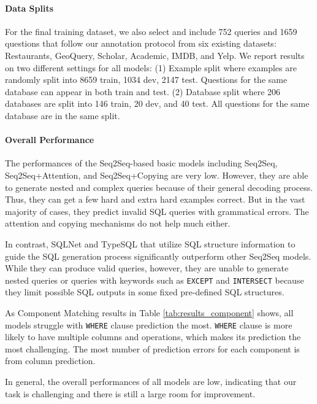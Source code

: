 \documentclass[11pt,a4paper]{article}
\begin{document}
\paragraph{Data Splits} 
For the final training dataset, we also select and include 752 queries and 1659 questions that follow our annotation protocol from six existing datasets: Restaurants, GeoQuery, Scholar, Academic, IMDB, and Yelp.
We report results on two different settings for all models: (1) Example split where examples are randomly split into 8659 train, 1034 dev, 2147 test. Questions for the same database can appear in both train and test. (2) Database split where 206 databases are split into 146 train, 20 dev, and 40 test. All questions for the same database are in the same split.
\paragraph{Overall Performance} 
The performances of the Seq2Seq-based basic models including Seq2Seq, Seq2Seq+Attention, and Seq2Seq+Copying are very low. However, they are able to generate nested and complex queries because of their general decoding process.
Thus, they can get a few hard and extra hard examples correct.
But in the vast majority of cases, they predict invalid SQL queries with grammatical errors.
The attention and copying mechanisms do not help much either.


In contrast, SQLNet and TypeSQL that utilize SQL structure information to guide the SQL generation process significantly outperform other Seq2Seq models. While they can produce valid queries, however, they are unable to generate nested queries or queries with keywords such as \texttt{EXCEPT} and \texttt{INTERSECT} because they limit possible SQL outputs in some fixed pre-defined SQL structures.

As Component Matching results in Table \ref{tab:results_component} shows, all models struggle with \texttt{WHERE} clause prediction the most. \texttt{WHERE} clause is more likely to have multiple columns and operations, which makes its prediction the most challenging. The most number of prediction errors for each component is from column prediction.

In general, the overall performances of all models are low, indicating that our task is challenging and there is still a large room for improvement.
\end{document}
